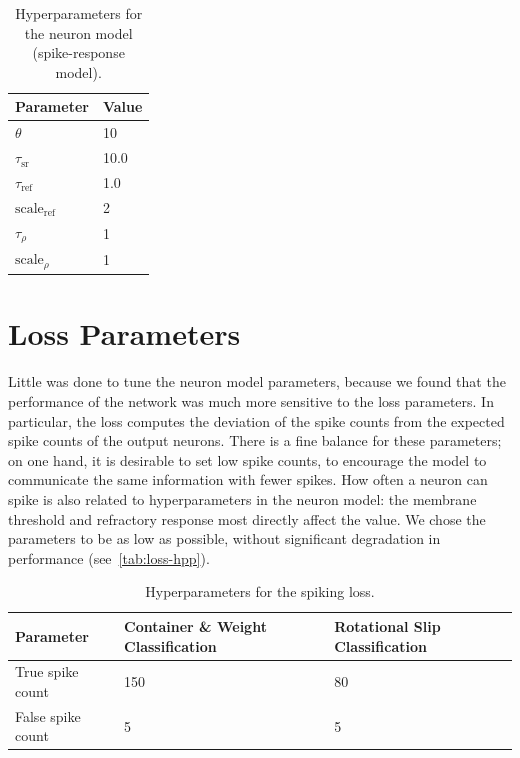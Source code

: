 \documentclass[fyp]{socreport}
\begin{document}
\begin{table}
  \centering
  \begin{tabular}{ll}
    \toprule
    \textbf{Parameter} & \textbf{Value} \\
    \midrule
    $\theta$ & 10 \\
    $\tau_{\text{sr}}$ & 10.0 \\
    $\tau_{\text{ref}}$ & 1.0 \\
    $\text{scale}_{\text{ref}}$ & 2 \\
    $\tau_{\rho}$ & 1 \\
    $\text{scale}_{\rho}$ & 1 \\
    \bottomrule
  \end{tabular}
  \caption{Hyperparameters for the neuron model (spike-response model).}
  \label{tab:srm-hpp}
\end{table}

\section{Loss Parameters}

Little was done to tune the neuron model parameters, because we found that the
performance of the network was much more sensitive to the loss parameters. In
particular, the loss computes the deviation of the spike counts from the
expected spike counts of the output neurons. There is a fine balance for these
parameters; on one hand, it is desirable to set low spike counts, to encourage
the model to communicate the same information with fewer spikes. How often a
neuron can spike is also related to hyperparameters in the neuron model: the
membrane threshold and refractory response most directly affect the value. We
chose the parameters to be as low as possible, without significant degradation
in performance (see~\autoref{tab:loss-hpp}).

\begin{table}
  \centering
  \begin{tabular}{lll}
    \toprule
    \textbf{Parameter} & \textbf{Container \& Weight Classification} & \textbf{Rotational Slip Classification} \\
    \midrule
    True spike count & 150 & 80\\
    False spike count & 5 & 5 \\
    \bottomrule
  \end{tabular}
  \caption{Hyperparameters for the spiking loss.}
  \label{tab:loss-hpp}
\end{table}
\end{document}
